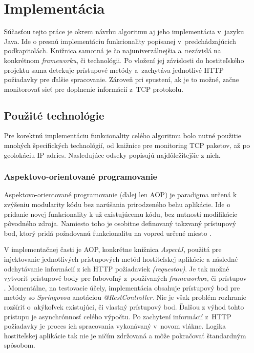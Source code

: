 \documentclass[
  printed, %
  table,   %
  lof,     %
  nolot,   %
  nocover
]{fithesis3}
\begin{document}
\section{Implementácia}
Súčasťou tejto práce je okrem návrhu algoritmu aj jeho implementácia v~jazyku
Java. Ide o presnú implementáciu funkcionality popísanej v~predchádzajúcich
podkapitolách. Knižnica samotná je čo najuniverzálnejšia a~nezávislá na
konkrétnom \textit{frameworku}, či technológii. Po vložení jej závislosti do
hostiteľského projektu sama detekuje prístupové metódy a~zachytáva jednotlivé
HTTP požiadavky pre ďalšie spracovanie. Zároveň pri spustení, ak je to možné,
začne monitorovať sieť pre doplnenie informácií z~TCP protokolu.

\subsection{Použité technológie}
Pre korektnú implementáciu funkcionality celého algoritmu bolo nutné použitie
mnohých špecifických technológií, od knižnice pre monitoring TCP paketov, až po
geolokáciu IP adries. Nasledujúce odseky popisujú najdôležitejšie z nich.

\subsubsection{\bf{Aspektovo-orientované programovanie}}
Aspektovo-orientované programovanie (ďalej len AOP) je paradigma určená k
zvýšeniu modularity kódu bez narúšania prirodzeného behu aplikácie. Ide o 
pridanie novej funkcionality k už existujúcemu kódu, bez nutnosti modifikácie
pôvodného zdroja. Namiesto toho je osobitne definovaný takzvaný prístupový bod,
ktorý pridá požadovanú funkcionalitu na vopred určené miesto \cite{Kiczales:1997:AOP}.

V implementačnej časti je AOP, konkrétne knižnica \textit{AspectJ}, použitá pre
injektovanie jednotlivých prístupových metód hostiteľskej aplikácie a následné
odchytávanie informácií z ich HTTP požiadaviek \textit{(requestov)}. Je tak možné vytvoriť prístupové
body pre ľubovoľný z~používaných \textit{frameworkov}, či prístupov \cite{Laddad:2009:AOP}. Momentálne, na
testovacie účely, implementácia obsahuje prístupový bod pre metódy so
\textit{Springovou} anotáciou \textit{@RestController}. Nie je však problém
rozhranie rozšíriť o~akýkoľvek existujúci, či vlastný prístupový bod. Ďalšou z 
výhod tohto prístupu je asynchrónnosť celého výpočtu. Po zachytení informácií
z~HTTP požiadavky je proces ich spracovania vykonávaný v~novom vlákne. Logika
hostiteľskej aplikácie tak nie je ničím zdržovaná a môže pokračovať štandardným
spôsobom.
\end{document}
